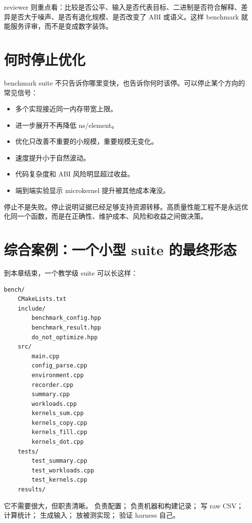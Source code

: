 reviewer 则重点看：比较是否公平、输入是否代表目标、二进制是否符合解释、差异是否大于噪声、是否有退化规模、是否改变了 ABI 或语义。这样 benchmark 就能服务评审，而不是变成数字装饰。

\section{何时停止优化}

benchmark suite 不只告诉你哪里变快，也告诉你何时该停。可以停止某个方向的常见信号：

\begin{itemize}
  \item 多个实现接近同一内存带宽上限。
  \item 进一步展开不再降低 ns/element。
  \item 优化只改善不重要的小规模，重要规模无变化。
  \item 速度提升小于自然波动。
  \item 代码复杂度和 ABI 风险明显超过收益。
  \item 端到端实验显示 microkernel 提升被其他成本淹没。
\end{itemize}

停止不是失败。停止说明证据已经足够支持资源转移。高质量性能工程不是永远优化同一个函数，而是在正确性、维护成本、风险和收益之间做决策。

\section{综合案例：一个小型 suite 的最终形态}

到本章结束，一个教学级 suite 可以长这样：

\begin{lstlisting}
bench/
    CMakeLists.txt
    include/
        benchmark_config.hpp
        benchmark_result.hpp
        do_not_optimize.hpp
    src/
        main.cpp
        config_parse.cpp
        environment.cpp
        recorder.cpp
        summary.cpp
        workloads.cpp
        kernels_sum.cpp
        kernels_copy.cpp
        kernels_fill.cpp
        kernels_dot.cpp
    tests/
        test_summary.cpp
        test_workloads.cpp
        test_kernels.cpp
    results/
\end{lstlisting}

它不需要很大，但职责清晰。  负责配置； 负责机器和构建记录； 写 raw CSV； 计算统计； 生成输入； 放被测实现； 验证 harness 自己。

